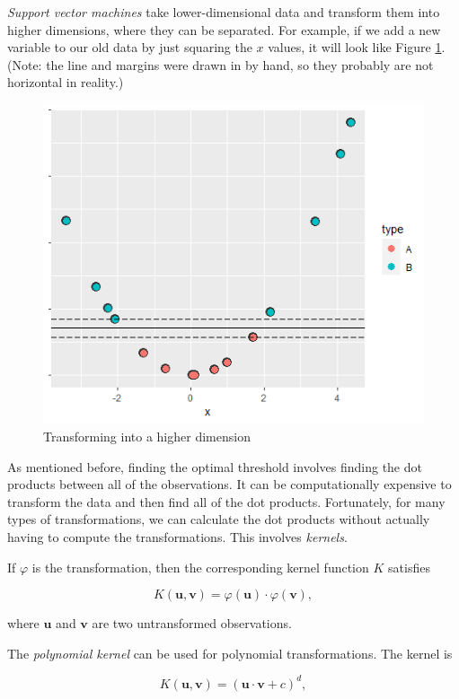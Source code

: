 \documentclass[
]{book}
\theoremstyle{definition}
\theoremstyle{definition}
\theoremstyle{definition}
\theoremstyle{definition}
\theoremstyle{remark}
\begin{document}
\emph{Support vector machines} take lower-dimensional data and transform them into higher dimensions, where they can be separated. For example, if we add a new variable to our old data by just squaring the \(x\) values, it will look like Figure \ref{fig:svm9}. (Note: the line and margins were drawn in by hand, so they probably are not horizontal in reality.)

\begin{figure}

{\centering \includegraphics[width=0.7\linewidth]{images/svm9} 

}

\caption{Transforming into a higher dimension}\label{fig:svm9}
\end{figure}

As mentioned before, finding the optimal threshold involves finding the dot products between all of the observations. It can be computationally expensive to transform the data and then find all of the dot products. Fortunately, for many types of transformations, we can calculate the dot products without actually having to compute the transformations. This involves \emph{kernels}.

If \(\varphi\) is the transformation, then the corresponding kernel function \(K\) satisfies

\[K(\mathbf{u},\mathbf{v})=\varphi(\mathbf{u})\cdot \varphi(\mathbf{v}),\]

where \(\mathbf{u}\) and \(\mathbf{v}\) are two untransformed observations.

The \emph{polynomial kernel} can be used for polynomial transformations. The kernel is

\[K(\textbf{u},\textbf{v})=(\textbf{u}\cdot\textbf{v}+c)^d,\]
\end{document}
